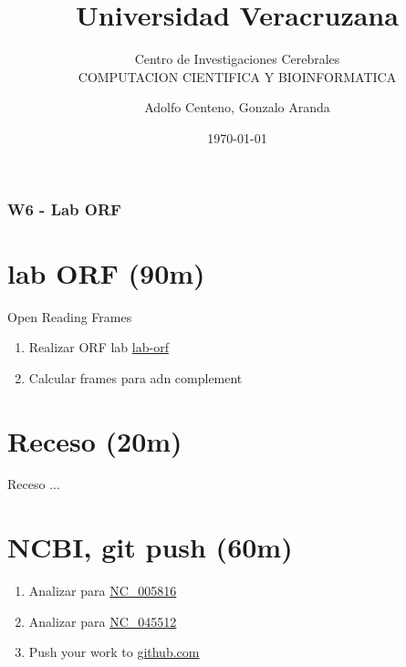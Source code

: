 \documentclass{beamer}
\begin{document}
\title{Universidad Veracruzana}  
\subtitle{Centro de Investigaciones Cerebrales\\COMPUTACION CIENTIFICA Y BIOINFORMATICA}
\author{Adolfo Centeno, Gonzalo Aranda}
\date{\today} 

\begin{frame}
\titlepage
\end{frame}

\begin{frame}\frametitle{W6 - Lab ORF }
\tableofcontents
\end{frame} 


\section{lab ORF (90m) }

\begin{frame}

Open Reading Frames

\begin{enumerate}

\item

	Realizar ORF lab \href{https://github.com/adsoftsito/python/blob/master/w5/files.py}{lab-orf} 
	
\item
	Calcular frames para adn complement
	
\end{enumerate} 


\end{frame}


\section{Receso  (20m) }

\begin{frame}


Receso ...

\end{frame}


\section{NCBI,  git push (60m) }

\begin{frame}

\begin{enumerate}

\item 
    Analizar para 	\href{https://www.ncbi.nlm.nih.gov/nuccore/NC\_005816}{NC\_005816} 
\item 
    Analizar para 	\href{https://www.ncbi.nlm.nih.gov/nuccore/1798174254}{NC\_045512} 
\item
	Push your work to \href{https://github.com}{github.com}

\end{enumerate} 


\end{frame}
\end{document}
